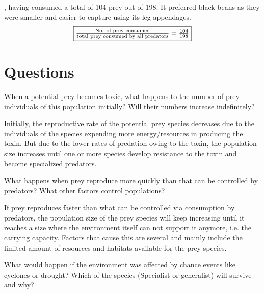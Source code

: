 \documentclass{scrartcl}
\begin{document}
, having consumed a total of 104 prey out of 198. It preferred black beans as they were smaller and easier to capture using its leg appendages.
\textcolor{red!80!black}{$$\fbox{$
\frac{\text{No. of prey consumed}}{\text{total prey consumed by all predators}} = \frac{104}{198}
$}$$}

\section{Questions}
\begin{question}
    When a potential prey becomes toxic, what happens to the number of prey individuals of this population initially? Will their numbers increase indefinitely?
\end{question}

\begin{solution*}
Initially, the reproductive rate of the potential prey species decreases due to the individuals of the species expending more energy/resources in producing the toxin. But due to the lower rates of predation owing to the toxin, the population size increases until one or more species develop resistance to the toxin and become specialized predators.
\end{solution*}

\begin{question}
    What happens when prey reproduce more quickly than that can be controlled by predators? What other factors control populations?
\end{question}

\begin{solution*}
If prey reproduces faster than what can be controlled via consumption by predators, the population size of the prey species will keep increasing until it reaches a size where the environment itself can not support it anymore, i.e. the carrying capacity. Factors that cause this are several and mainly include the limited amount of resources and habitats available for the prey species.    
\end{solution*}

\begin{question}
    What would happen if the environment was affected by chance events like cyclones or drought? Which of the species (Specialist or generalist) will survive and why?
\end{question}
\end{document}
